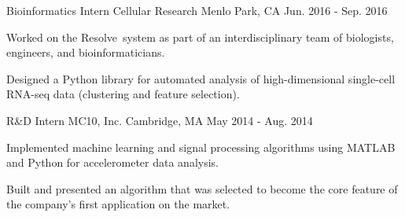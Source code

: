 
\begin{cventries}
  \cventry
    {Bioinformatics Intern} %
    {Cellular Research} %
    {Menlo Park, CA} %
    {Jun. 2016 - Sep. 2016} %
    {
      \begin{cvitems} %
        \item {Worked on the Resolve\texttrademark \ system as part of an interdisciplinary team of biologists, engineers, and bioinformaticians.}
        \item {Designed a Python library for automated analysis of high-dimensional single-cell RNA-seq data (clustering and feature selection).}
      \end{cvitems}
    }
  \cventry
    {R\&D Intern} %
    {MC10, Inc.} %
    {Cambridge, MA} %
    {May 2014 - Aug. 2014} %
    {
      \begin{cvitems} %
        \item {Implemented machine learning and signal processing algorithms using MATLAB and Python for accelerometer data analysis.}
        \item {Built and presented an algorithm that was selected to become the core feature of the company's first application on the market.}
      \end{cvitems}
    }

\end{cventries}
